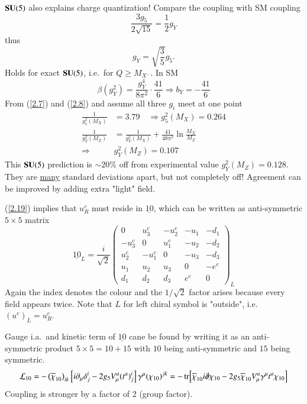 $\mathbf{SU}(5)$ also explains charge quantization!
Compare the coupling with SM coupling
\begin{equation*}
   \frac{3 g_5}{2 \sqrt{15}} = \frac{1}{2} g_Y
\end{equation*}
thus
\begin{equation}
   g_Y = \sqrt{\frac{3}{5}} g_5. \label{2.20}
\end{equation}
Holds for exact $\mathbf{SU}(5)$, i.e.~for $Q \geq M_{X^-}$. In SM
\begin{equation}
   \beta(g_Y^2) = \frac{g_Y^4}{8\pi^2} \cdot \frac{41}{6} \Rightarrow b_Y = - \frac{41}{6}
\end{equation}
From (\ref{2.7}) and (\ref{2.8}) and assume all three $g_i$ meet at one point
\begin{align*}
   \frac{1}{g_5^2(M_X)} &= 3.79 \quad \Rightarrow g_5^2(M_X) = 0.264 \\
   \frac{1}{g_Y^2(M_Z)} &= \frac{1}{g_Y^2(M_X)} + \frac{41}{48\pi^2} \ln \frac{M_X}{M_Z} \\
   \Rightarrow & g_Y^2 (M_Z) = 0.107
\end{align*}
This $\mathbf{SU}(5)$ prediction is $\sim 20\%$ off from experimental value $g_Y^2(M_Z) = 0.128$. They are \underline{many} standard deviations apart, but not completely off! Agreement can be improved by adding extra "light" field.

(\ref{2.19}) implies that $u^c_R$ must  reside in $\underline{10}$, which can be written as anti-symmetric $5\times 5 $ matrix
\begin{equation}
   \underline{10}_L = \frac{i}{\sqrt{2}} 
   \begin{pmatrix} 
   0 & u_3^c & -u_2^c & -u_1 & -d_1 \\ 
   -u_3^c & 0 & u^c_1 & -u_2 & -d_2 \\
   u_2^c & -u_1^c & 0 & -u_3 & -d_3 \\
   u_1 & u_2 & u_3 & 0 & -e^c \\
   d_1 & d_2 & d_3 & e^c & 0
\end{pmatrix} _L \label{2.22}
\end{equation}
Again the index denotes the colour and the $1/\sqrt{2}$ factor arises because every field appears twice. Note that $L$ for left chiral symbol is "outside", i.e.~$(u^c)_L = u_R^c$.

Gauge i.a.~and kinetic term of $\underline{10}$ cane be found by writing it as an anti-symmetric product $5\times 5 = 10 + 15$ with $10$ being anti-symmetric and $15$ being symmetric.
\begin{equation}
   \mathcal{L}_{10} = - \left( \overline{\chi}_{10} \right)_{ik} \left[ i \partial_\mu \delta^i_j - 2 g_5 V^a_\mu (t^a)^i_j \right] \gamma^\mu (\chi_{1 0})^{jk} 
                        = - \tr[\overline{\chi}_{10} i \slashed{\partial}\chi_{10} - 2 g_5 \overline{\chi}_{10} V^a_\mu \gamma^\mu t^a \chi_{10}] \label{2.23}
\end{equation}
Coupling is stronger by a factor of 2 (group factor).

